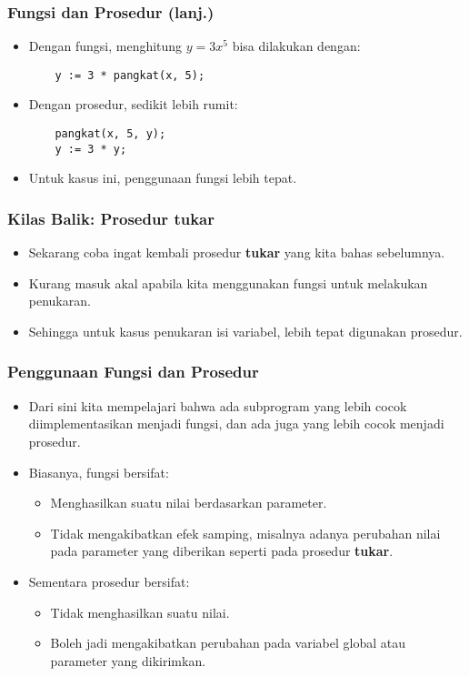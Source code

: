 \documentclass{beamer}
\begin{document}
\begin{frame}[fragile]
\frametitle{Fungsi dan Prosedur (lanj.)}
\begin{itemize}
	\item Dengan fungsi, menghitung $y = 3x^5$ bisa dilakukan dengan:
	\begin{lstlisting}
	y := 3 * pangkat(x, 5);
	\end{lstlisting}
	
	\item Dengan prosedur, sedikit lebih rumit:
	\begin{lstlisting}
	pangkat(x, 5, y);
	y := 3 * y;
	\end{lstlisting}
	
	\item Untuk kasus ini, penggunaan fungsi lebih tepat.
\end{itemize}
\end{frame}

\begin{frame}
\frametitle{Kilas Balik: Prosedur tukar}
\begin{itemize}
	\item Sekarang coba ingat kembali prosedur \textbf{tukar} yang kita bahas sebelumnya.
	\item Kurang masuk akal apabila kita menggunakan fungsi untuk melakukan penukaran.
	\item Sehingga untuk kasus penukaran isi variabel, lebih tepat digunakan prosedur.
\end{itemize}
\end{frame}

\begin{frame}
\frametitle{Penggunaan Fungsi dan Prosedur}
\begin{itemize}
	\item Dari sini kita mempelajari bahwa ada subprogram yang lebih cocok diimplementasikan menjadi fungsi, dan ada juga yang lebih cocok menjadi prosedur.
	\item Biasanya, fungsi bersifat:
	\begin{itemize}
		\item Menghasilkan suatu nilai berdasarkan parameter.
		\item Tidak mengakibatkan efek samping, misalnya adanya perubahan nilai pada parameter yang diberikan seperti pada prosedur \textbf{tukar}.
	\end{itemize}
	\item Sementara prosedur bersifat:
	\begin{itemize}
		\item Tidak menghasilkan suatu nilai.
		\item Boleh jadi mengakibatkan perubahan pada variabel global atau parameter yang dikirimkan.
	\end{itemize}
\end{itemize}
\end{frame}
\end{document}
